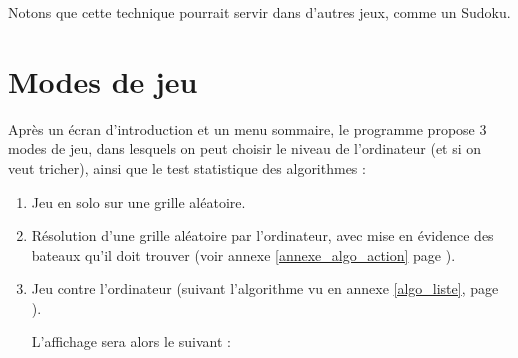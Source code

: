 Notons que cette technique pourrait servir dans d'autres jeux, comme un Sudoku.


\newpage
\section{Modes de jeu}
Après un écran d'introduction et un menu sommaire, le programme propose 3 modes de jeu, dans lesquels on peut choisir le niveau de l'ordinateur (et si on veut tricher), ainsi que le test statistique des algorithmes :
\begin{enumerate}
\item Jeu en solo sur une grille aléatoire.
\item Résolution d'une grille aléatoire par l'ordinateur, avec mise en évidence des bateaux qu'il doit trouver (voir annexe \ref{annexe_algo_action} page \pageref{annexe_algo_action}).
\item Jeu contre l'ordinateur (suivant l'algorithme vu en annexe \ref{algo_liste}, page \pageref{algo_partie}).

L'affichage sera alors le suivant :


\end{enumerate}
